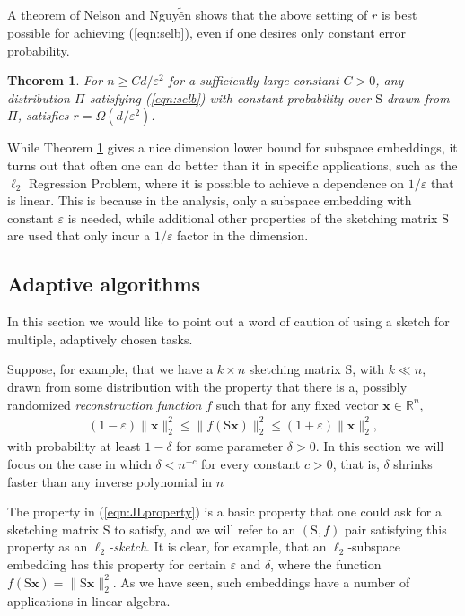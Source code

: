 \documentclass[11pt]{article}
\newtheorem{theorem}{Theorem}
\newcommand{\mat}[1]{{\ensuremath{\bm{\mathrm{#1}}}}}
\def\matS{\mat{S}}
\def\x{{\mathbf x}}
\newcommand{\eps}{\varepsilon}
\begin{document}
A theorem of Nelson and Nguy$\tilde{\hat{\mbox{e}}}$n \cite{nn14} shows that the above setting of $r$ is best possible
for achieving (\ref{eqn:selb}), even if one desires only constant error probability. 

\begin{theorem}\label{thm:lbnn}
For $n \geq Cd/\eps^2$ for a sufficiently large constant $C > 0$, 
any distribution $\Pi$ satisfying (\ref{eqn:selb}) with constant probability over $\matS$
drawn from $\Pi$, satisfies $r = \Omega(d/\eps^2)$. 
\end{theorem}

While Theorem \ref{thm:lbnn} gives a nice dimension lower bound for subspace embeddings,
it turns out that often one can do better than it in specific applications, such as the $\ell_2$ Regression
Problem, where it is possible to achieve a dependence on $1/\eps$ that is linear. This is because in the
analysis, only a subspace embedding with constant $\eps$ is needed, while additional
other properties of the sketching matrix $\matS$ are used that only incur a $1/\eps$ factor in the dimension.  

\subsection{Adaptive algorithms}\label{sec:adaptiveLower}
In this section we would like to point out a word of caution of using a sketch for multiple, adaptively chosen
tasks. 

Suppose, for example, that 
we have a $k \times n$ sketching matrix $\matS$, with $k \ll n$, drawn from some distribution
with the property that there is a, possibly randomized {\it reconstruction function} $f$ 
such that for any fixed vector $\x \in \mathbb{R}^n$, 
\begin{eqnarray}\label{eqn:JLproperty}
(1-\eps)\|\x\|_2^2 \leq \|f(\matS\x)\|_2^2 \leq (1+\eps)\|\x\|_2^2,
\end{eqnarray}
with probability at least $1-\delta$ for some parameter $\delta > 0$. In this section we will focus
on the case in which $\delta< n^{-c}$ for every constant $c > 0$, that is, $\delta$ shrinks faster
than any inverse polynomial in $n$

The property in (\ref{eqn:JLproperty}) is a basic property 
that one could ask for a sketching matrix $\matS$ to satisfy, and we will refer to an $(\matS, f)$ pair satisfying
this property as 
an {\it $\ell_2$-sketch}. It is
clear, for example, that an $\ell_2$-subspace embedding has this property for certain $\eps$ and $\delta$, 
where the function $f(\matS\x) = \|\matS\x\|_2^2$. As
we have seen, such embeddings have a number of applications in linear algebra. 
\end{document}
